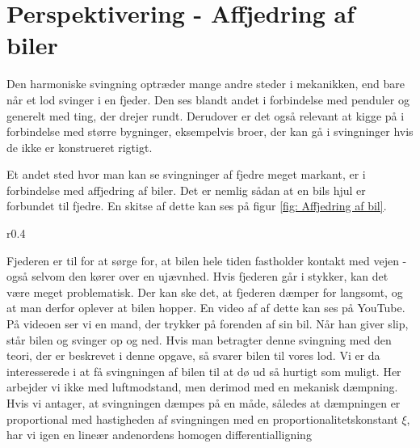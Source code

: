 \chapter{Perspektivering - Affjedring af biler}
Den harmoniske svingning optræder mange andre steder i mekanikken, end bare når et lod svinger i en fjeder.
Den ses blandt andet i forbindelse med penduler og generelt med ting, der drejer rundt.
Derudover er det også relevant at kigge på i forbindelse med større bygninger, eksempelvis broer, der kan gå i svingninger hvis de ikke er konstrueret rigtigt. 

Et andet sted hvor man kan se svingninger af fjedre meget markant, er i forbindelse med affjedring af biler. 
Det er nemlig sådan at en bils hjul er forbundet til fjedre. 
En skitse af dette kan ses på figur \ref{fig: Affjedring af bil}.

\begin{wrapfigure}{r}{0.4\textwidth}
\center
{}
\caption{Skitsetegning af fjeder (blå) fastsat til bils hjul.}
\label{fig: Affjedring af bil}
\end{wrapfigure}

Fjederen er til for at sørge for, at bilen hele tiden fastholder kontakt med vejen - også selvom den kører over en ujævnhed. 
Hvis fjederen går i stykker, kan det være meget problematisk. 
Der kan ske det, at fjederen dæmper for langsomt, og at man derfor oplever at bilen hopper.
En video af af dette kan ses på YouTube.
På videoen ser vi en mand, der trykker på forenden af sin bil. 
Når han giver slip, står bilen og svinger op og ned. 
Hvis man betragter denne svingning med den teori, der er beskrevet i denne opgave, så svarer bilen til vores lod.
Vi er da interesserede i at få svingningen af bilen til at dø ud så hurtigt som muligt. 
Her arbejder vi ikke med luftmodstand, men derimod med en mekanisk dæmpning. 
Hvis vi antager, at svingningen dæmpes på en måde, således at dæmpningen er proportional med hastigheden af svingningen med en proportionalitetskonstant $\xi$, har vi igen en lineær andenordens homogen differentialligning

